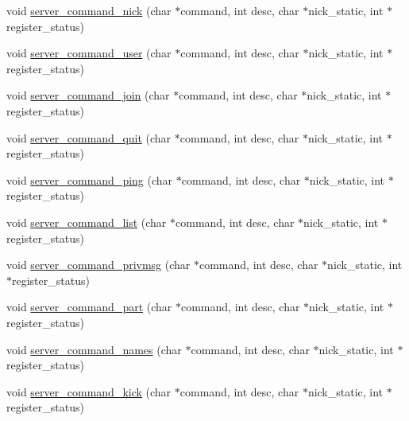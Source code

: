 \begin{DoxyCompactItemize}
\item 
void \hyperlink{G-2313-06-P1__function__handlers_8c_aeefab469ba48ce1655dd5afd14f104b4}{server\+\_\+command\+\_\+nick} (char $\ast$command, int desc, char $\ast$nick\+\_\+static, int $\ast$register\+\_\+status)
\item 
void \hyperlink{G-2313-06-P1__function__handlers_8c_ad09156d6bd4cf58f4345e0bf851ff099}{server\+\_\+command\+\_\+user} (char $\ast$command, int desc, char $\ast$nick\+\_\+static, int $\ast$register\+\_\+status)
\item 
void \hyperlink{G-2313-06-P1__function__handlers_8c_a375c143c5469d1bb4fa7793b310ad68e}{server\+\_\+command\+\_\+join} (char $\ast$command, int desc, char $\ast$nick\+\_\+static, int $\ast$register\+\_\+status)
\item 
void \hyperlink{G-2313-06-P1__function__handlers_8c_a3df99a1f2cefc2d91d65cbb6dd555f96}{server\+\_\+command\+\_\+quit} (char $\ast$command, int desc, char $\ast$nick\+\_\+static, int $\ast$register\+\_\+status)
\item 
void \hyperlink{G-2313-06-P1__function__handlers_8c_acc1c181bf44087b9216d1b59809937aa}{server\+\_\+command\+\_\+ping} (char $\ast$command, int desc, char $\ast$nick\+\_\+static, int $\ast$register\+\_\+status)
\item 
void \hyperlink{G-2313-06-P1__function__handlers_8c_af289e3cc397e24e9b8c12c35bce68285}{server\+\_\+command\+\_\+list} (char $\ast$command, int desc, char $\ast$nick\+\_\+static, int $\ast$register\+\_\+status)
\item 
void \hyperlink{G-2313-06-P1__function__handlers_8c_a8daf68135f2d9e9412c04a2980bdfb2f}{server\+\_\+command\+\_\+privmsg} (char $\ast$command, int desc, char $\ast$nick\+\_\+static, int $\ast$register\+\_\+status)
\item 
void \hyperlink{G-2313-06-P1__function__handlers_8c_aba1a3da1fb58bb35076e7ea56037463e}{server\+\_\+command\+\_\+part} (char $\ast$command, int desc, char $\ast$nick\+\_\+static, int $\ast$register\+\_\+status)
\item 
void \hyperlink{G-2313-06-P1__function__handlers_8c_a0fe05d80af27ae220f8fa631468606ea}{server\+\_\+command\+\_\+names} (char $\ast$command, int desc, char $\ast$nick\+\_\+static, int $\ast$register\+\_\+status)
\item 
void \hyperlink{G-2313-06-P1__function__handlers_8c_a33025bd9c7bf8fbb2bf9cf722c07465c}{server\+\_\+command\+\_\+kick} (char $\ast$command, int desc, char $\ast$nick\+\_\+static, int $\ast$register\+\_\+status)

\end{DoxyCompactItemize}
